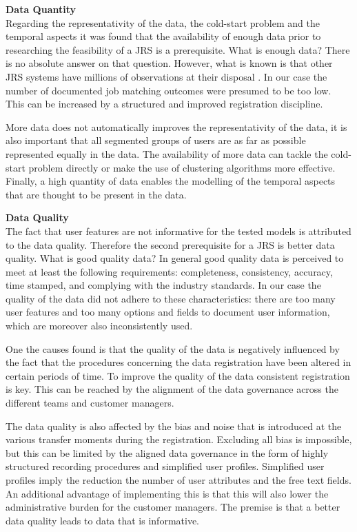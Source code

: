 \noindent
\textbf{Data Quantity}\\
Regarding the representativity of the data, the cold-start problem and the temporal aspects it was found that the availability of enough data prior to researching the feasibility of a JRS is a prerequisite.
What is enough data?
There is no absolute answer on that question. 
However, what is known is that other JRS systems have millions of observations at their disposal \cite{kenthapadi2017personalized, T.Al-Otaibi2012ASystems, Zheng2012JobSurvey, hong2013job}.
In our case the number of documented job matching outcomes were presumed to be too low. 
This can be increased by a structured and improved registration discipline.

More data does not automatically improves the representativity of the data, it is also important that all segmented groups of users are as far as possible represented equally in the data.
The availability of more data can tackle the cold-start problem directly or make the use of clustering algorithms more effective. 
Finally, a high quantity of data enables the modelling of the temporal aspects that are thought to be present in the data.

\noindent
\textbf{Data Quality}\\
The fact that user features are not informative for the tested models is attributed to the data quality. 
Therefore the second prerequisite for a JRS is better data quality.
What is good quality data?
In general good quality data is perceived to meet at least the following requirements: completeness, consistency, accuracy, time stamped, and complying with the industry standards. 
In our case the quality of the data did not adhere to these characteristics: there are too many user features and too many options and fields to document user information, which are moreover also inconsistently used. 

One the causes found is that the quality of the data is negatively influenced by the fact that the procedures concerning the data registration have been altered in certain periods of time. 
To improve the quality of the data consistent registration is key.
This can be reached by the alignment of the data governance across the different teams and customer managers.

The data quality is also affected by the bias and noise that is introduced at the various transfer moments during the registration.
Excluding all bias is impossible, but this can be limited by the aligned data governance in the form of highly structured recording procedures and simplified user profiles.
Simplified user profiles imply the reduction the number of user attributes and the free text fields. 
An additional advantage of implementing this is that this will also lower the administrative burden for the customer managers.
The premise is that a better data quality leads to data that is informative.

